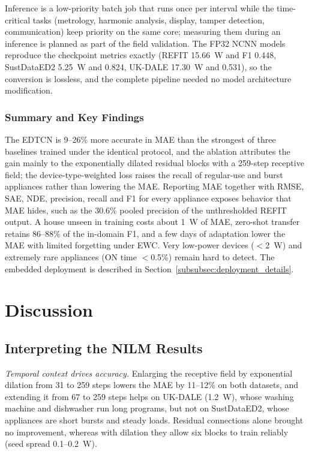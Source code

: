 \documentclass[fleqn,10pt]{wlscirep}
\begin{document}
Inference is a low-priority batch job that runs once per interval while the time-critical tasks (metrology, harmonic analysis, display, tamper detection, communication) keep priority on the same core; measuring them during an inference is planned as part of the field validation. The FP32 NCNN models reproduce the checkpoint metrics exactly (REFIT 15.66~W and F1 0.448, SustDataED2 5.25~W and 0.824, UK-DALE 17.30~W and 0.531), so the conversion is lossless, and the complete pipeline needed no model architecture modification.


\subsubsection{Summary and Key Findings}
\label{subsubsec:nilm_summary}

The EDTCN is 9--26\% more accurate in MAE than the strongest of three baselines trained under the identical protocol, and the ablation attributes the gain mainly to the exponentially dilated residual blocks with a 259-step receptive field; the device-type-weighted loss raises the recall of regular-use and burst appliances rather than lowering the MAE. Reporting MAE together with RMSE, SAE, NDE, precision, recall and F1 for every appliance exposes behavior that MAE hides, such as the 30.6\% pooled precision of the unthresholded REFIT output. A house unseen in training costs about 1~W of MAE, zero-shot transfer retains 86--88\% of the in-domain F1, and a few days of adaptation lower the MAE with limited forgetting under EWC. Very low-power devices ($<$2~W) and extremely rare appliances (ON time $<$0.5\%) remain hard to detect. The embedded deployment is described in Section~\ref{subsubsec:deployment_details}.

\section{Discussion}
\label{sec:discussion}

\subsection{Interpreting the NILM Results}
\label{subsec:interpretation}

\textit{Temporal context drives accuracy.} Enlarging the receptive field by exponential dilation from 31 to 259 steps lowers the MAE by 11--12\% on both datasets, and extending it from 67 to 259 steps helps on UK-DALE (1.2~W), whose washing machine and dishwasher run long programs, but not on SustDataED2, whose appliances are short bursts and steady loads. Residual connections alone brought no improvement, whereas with dilation they allow six blocks to train reliably (seed spread 0.1--0.2~W).
\end{document}
